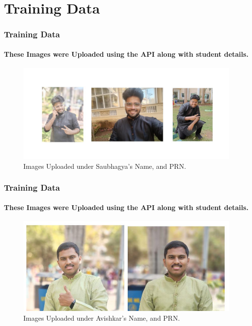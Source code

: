 \documentclass[aspectratio=169]{beamer}
\begin{document}
\section{Training Data}
\begin{frame}
	\centering
	\frametitle{Training Data}
	\framesubtitle{These Images were Uploaded using the API along with student details.}
	\begin{minipage}{0.95\textwidth}
		\begin{figure}[H]
			\centering
			\includegraphics[width=.95\textwidth]{saubhagya.jpg}
			\caption{Images Uploaded under Saubhagya's Name, and PRN. }
		\end{figure}
	\end{minipage}
\end{frame}
\begin{frame}
	\centering
	\frametitle{Training Data}
	\framesubtitle{These Images were Uploaded using the API along with student details.}
	\begin{minipage}{0.95\textwidth}
		\begin{figure}[H]
			\centering
			\includegraphics[width=.95\textwidth]{avishkar.jpg}
			\caption{Images Uploaded under Avishkar's Name, and PRN. }
		\end{figure}
	\end{minipage}
\end{frame}
\end{document}
